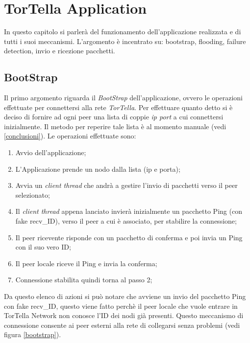 \chapter{TorTella Application}
In questo capitolo si parlerà del funzionamento dell'applicazione realizzata e di tutti i suoi meccanismi. L'argomento è incentrato su: bootstrap, flooding, failure detection, invio e ricezione pacchetti.
\section{BootStrap}
Il primo argomento riguarda il \textit{BootStrap} dell'applicazione, ovvero le operazioni effettuate per connettersi alla rete \textit{TorTella}. Per effettuare quanto detto si è deciso di fornire ad ogni peer una lista di coppie \textit{ip port} a cui connettersi inizialmente. Il metodo per reperire tale lista è al momento manuale (vedi \ref{conclusioni}). Le operazioni effettuate sono:
\begin{enumerate}
\item Avvio dell'applicazione;
\item L'Applicazione prende un nodo dalla lista (ip e porta);
\item Avvia un \textit{client thread} che andrà a gestire l'invio di pacchetti verso il peer selezionato;
\item Il \textit{client thread} appena lanciato invierà inizialmente un pacchetto Ping (con fake recv\_ID), verso il peer a cui è associato, per stabilire la connessione;
\item Il peer ricevente risponde con un pacchetto di conferma e poi invia un Ping con il suo vero ID;
\item Il peer locale riceve il Ping e invia la conferma;
\item Connessione stabilita quindi torna al passo 2;
\end{enumerate}
Da questo elenco di azioni si può notare che avviene un invio del pacchetto Ping con fake recv\_ID, questo viene fatto perchè il peer locale che vuole entrare in TorTella Network non conosce l'ID dei nodi già presenti. Questo meccanismo di connessione consente ai peer esterni alla rete di collegarsi senza problemi (vedi figura \ref{bootstrap}).
